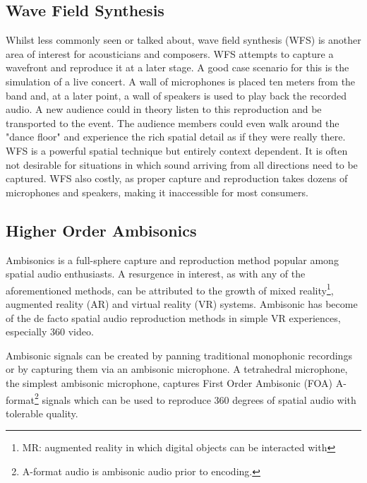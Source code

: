 

\subsection{Wave Field Synthesis}
\label{subsec:wfs}


Whilst less commonly seen or talked about, wave field synthesis (WFS) is another area of interest for acousticians and composers. WFS attempts to capture a wavefront and reproduce it at a later stage. A good case scenario for this is the simulation of a live concert. A wall of microphones is placed ten meters from the band and, at a later point, a wall of speakers is used to play back the recorded audio. A new audience could in theory listen to this reproduction and be transported to the event. The audience members could even walk around the "dance floor" and experience the rich spatial detail as if they were really there. WFS is a powerful spatial technique but entirely context dependent. It is often not desirable for situations in which sound arriving from all directions need to be captured. WFS also costly, as proper capture and reproduction takes dozens of microphones and speakers, making it inaccessible for most consumers.

\subsection{Higher Order Ambisonics}
\label{subsec:ambi}

Ambisonics is a full-sphere capture and reproduction method popular among spatial audio enthusiasts. A resurgence in interest, as with any of the aforementioned methods, can be attributed to the growth of mixed reality\footnote{MR: augmented reality in which digital objects can be interacted with}, augmented reality (AR) and virtual reality (VR) systems. Ambisonic has become of the de facto spatial audio reproduction methods in simple VR experiences, especially 360 video. 

Ambisonic signals can be created by panning traditional monophonic recordings or by capturing them via an ambisonic microphone. A tetrahedral microphone, the simplest ambisonic microphone, captures First Order Ambisonic (FOA) A-format\footnote{A-format audio is ambisonic audio prior to encoding.} signals which can be used to reproduce 360 degrees of spatial audio with tolerable quality. 

